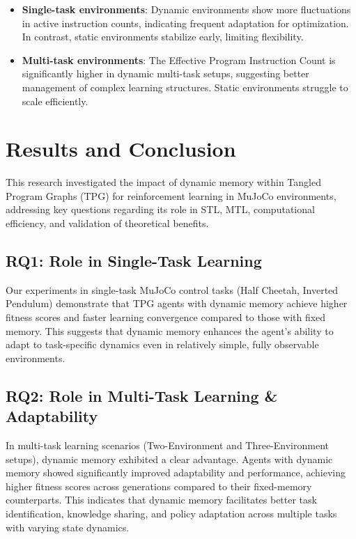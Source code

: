 \documentclass[sigconf]{acmart}
\begin{document}
\begin{itemize}
  \item \textbf{Single-task environments}: Dynamic environments show more fluctuations in active instruction counts, indicating frequent adaptation for optimization. In contrast, static environments stabilize early, limiting flexibility.
  \item \textbf{Multi-task environments}: The Effective Program Instruction Count is significantly higher in dynamic multi-task setups, suggesting better management of complex learning structures. Static environments struggle to scale efficiently.
\end{itemize}

\section{Results and Conclusion}

This research investigated the impact of dynamic memory within Tangled Program Graphs (TPG) for 
reinforcement learning in MuJoCo environments, addressing key questions regarding its role in 
STL, MTL, computational efficiency, and validation of theoretical benefits.

\subsection{RQ1: Role in Single-Task Learning} 
Our experiments in single-task MuJoCo control tasks (Half Cheetah, Inverted Pendulum) demonstrate 
that TPG agents with dynamic memory achieve higher fitness scores and faster learning convergence 
compared to those with fixed memory. This suggests that dynamic memory enhances the agent's ability 
to adapt to task-specific dynamics even in relatively simple, fully observable environments.

\subsection{RQ2: Role in Multi-Task Learning \& Adaptability} 
In multi-task learning scenarios (Two-Environment and Three-Environment setups), dynamic memory exhibited a clear advantage. 
Agents with dynamic memory showed significantly improved adaptability and performance, achieving 
higher fitness scores across generations compared to their fixed-memory counterparts. This indicates 
that dynamic memory facilitates better task identification, knowledge sharing, and policy adaptation 
across multiple tasks with varying state dynamics.
\end{document}
